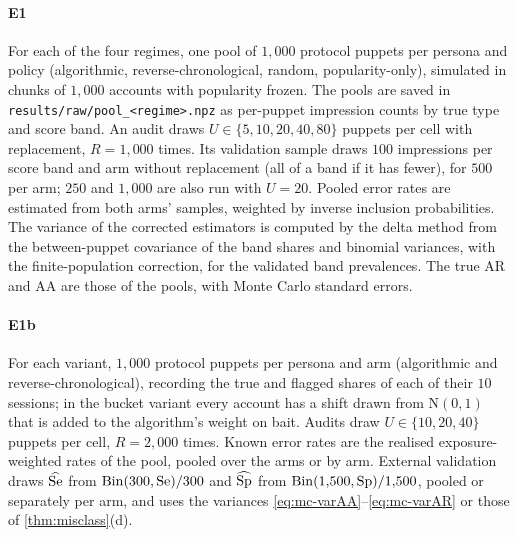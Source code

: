 \paragraph{E1} For each of the four regimes, one pool of $1{,}000$ protocol puppets per persona and policy (algorithmic, reverse-chronological, random, popularity-only), simulated in chunks of $1{,}000$ accounts with popularity frozen. The pools are saved in \texttt{results/raw/pool\_<regime>.npz} as per-puppet impression counts by true type and score band. An audit draws $U\in\{5,10,20,40,80\}$ puppets per cell with replacement, $R=1{,}000$ times. Its validation sample draws $100$ impressions per score band and arm without replacement (all of a band if it has fewer), for $500$ per arm; $250$ and $1{,}000$ are also run with $U=20$. Pooled error rates are estimated from both arms' samples, weighted by inverse inclusion probabilities. The variance of the corrected estimators is computed by the delta method from the between-puppet covariance of the band shares and binomial variances, with the finite-population correction, for the validated band prevalences. The true $\mathrm{AR}$ and $\mathrm{AA}$ are those of the pools, with Monte Carlo standard errors.

\paragraph{E1b} For each variant, $1{,}000$ protocol puppets per persona and arm (algorithmic and reverse-chronological), recording the true and flagged shares of each of their $10$ sessions; in the bucket variant every account has a shift drawn from $\mathrm N(0,1)$ that is added to the algorithm's weight on bait. Audits draw $U\in\{10,20,40\}$ puppets per cell, $R=2{,}000$ times. Known error rates are the realised exposure-weighted rates of the pool, pooled over the arms or by arm. External validation draws $\widehat{\mathrm{Se}}$ from $\mathrm{Bin}(300,\mathrm{Se})/300$ and $\widehat{\mathrm{Sp}}$ from $\mathrm{Bin}(1{,}500,\mathrm{Sp})/1{,}500$, pooled or separately per arm, and uses the variances \eqref{eq:mc-varAA}--\eqref{eq:mc-varAR} or those of \cref{thm:misclass}(d).

